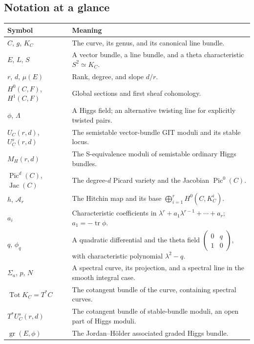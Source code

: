 \documentclass[11pt,a4paper]{article}
\numberwithin{equation}{section}
\theoremstyle{definition}
\newcommand{\Pic}{\operatorname{Pic}}
\newcommand{\Jac}{\operatorname{Jac}}
\newcommand{\Tot}{\operatorname{Tot}}
\newcommand{\tr}{\operatorname{tr}}
\newcommand{\gr}{\operatorname{gr}}
\begin{document}



\subsection*{Notation at a glance}
\begin{longtable}{@{}p{}p{}@{}}
\toprule Symbol & Meaning\\\midrule\endhead
$C$, $g$, $K_C$ & The curve, its genus, and its canonical line bundle.\\
$E$, $L$, $S$ & A vector bundle, a line bundle, and a theta characteristic $S^2\simeq K_C$.\\
$r$, $d$, $\mu(E)$ & Rank, degree, and slope $d/r$.\\
$H^0(C,F)$, $H^1(C,F)$ & Global sections and first sheaf cohomology.\\
$\phi$, $\Lambda$ & A Higgs field; an alternative twisting line for explicitly twisted pairs.\\
$U_C(r,d)$, $U_C^s(r,d)$ & The semistable vector-bundle GIT moduli and its stable locus.\\
$M_H(r,d)$ & The S-equivalence moduli of semistable ordinary Higgs bundles.\\
$\Pic^d(C)$, $\Jac(C)$ & The degree-$d$ Picard variety and the Jacobian $\Pic^0(C)$.\\
$h$, $\mathcal A_r$ & The Hitchin map and its base $\bigoplus_{i=1}^rH^0(C,K_C^i)$.\\
$a_i$ & Characteristic coefficients in $\lambda^r+a_1\lambda^{r-1}+\cdots+a_r$; $a_1=-\tr\phi$.\\
$q$, $\phi_q$ & A quadratic differential and the theta field $\left(\begin{smallmatrix}0&q\\1&0\end{smallmatrix}\right)$, with characteristic polynomial $\lambda^2-q$.\\
$\Sigma_a$, $p$, $N$ & A spectral curve, its projection, and a spectral line in the smooth integral case.\\
$\Tot K_C=T^*C$ & The cotangent bundle of the curve, containing spectral curves.\\
$T^*U_C^s(r,d)$ & The cotangent bundle of stable-bundle moduli, an open part of Higgs moduli.\\
$\gr(E,\phi)$ & The Jordan--Hölder associated graded Higgs bundle.\\
\bottomrule
\end{longtable}
\end{document}
